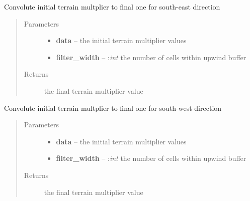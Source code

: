 \documentclass[letterpaper,10pt,english]{sphinxmanual}
\begin{document}

\begin{fulllineitems}
\label{docs/terrain:terrain_mult.convo_se}
Convolute initial terrain multplier to final one for south-east direction
\begin{quote}\begin{description}
\item[{Parameters}] \leavevmode\begin{itemize}
\item {} 
\textbf{data} --  the initial terrain multiplier values

\item {} 
\textbf{filter\_width} -- :\emph{int} the number of cells within upwind buffer

\end{itemize}

\item[{Returns}] \leavevmode
{} the final terrain multiplier value

\end{description}\end{quote}

\end{fulllineitems}



\begin{fulllineitems}
\label{docs/terrain:terrain_mult.convo_sw}
Convolute initial terrain multplier to final one for south-west direction
\begin{quote}\begin{description}
\item[{Parameters}] \leavevmode\begin{itemize}
\item {} 
\textbf{data} --  the initial terrain multiplier values

\item {} 
\textbf{filter\_width} -- :\emph{int} the number of cells within upwind buffer

\end{itemize}

\item[{Returns}] \leavevmode
{} the final terrain multiplier value

\end{description}\end{quote}

\end{fulllineitems}
\end{document}
